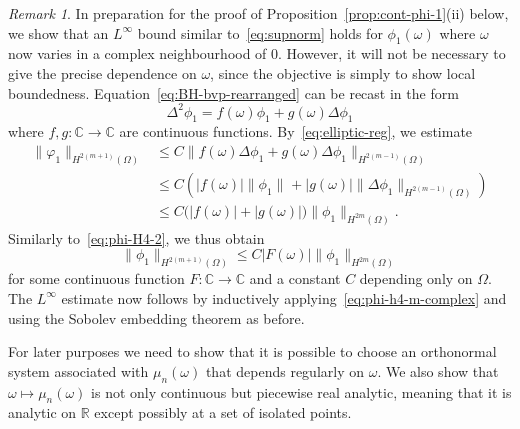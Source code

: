 \documentclass[a4paper, reqno]{amsart}
\numberwithin{equation}{section}
\theoremstyle{plain}
\theoremstyle{definition}
\theoremstyle{remark}
\newtheorem{remark}[theorem]{Remark}
\newcommand{\RR}{\mathbb{R}}
\newcommand{\CC}{\mathbb{C}}
\begin{document}
\begin{remark}
  \label{rmk:complex-omega}
  In preparation for the proof of Proposition~\ref{prop:cont-phi-1}(ii) below, we show that an $L^\infty$ bound similar to~\eqref{eq:supnorm} holds for $\phi_1(\omega)$ where $\omega$ now varies in a complex neighbourhood of 0. However, it will not be necessary to give the precise dependence on $\omega$, since the objective is simply to show local boundedness. Equation~\eqref{eq:BH-bvp-rearranged} can be recast in the form
  \begin{displaymath}
    \Delta^2 \phi_1 = f(\omega)\phi_1 + g(\omega) \Delta\phi_1
  \end{displaymath}
  where $f, g\colon \CC \to \CC$ are continuous functions. By~\eqref{eq:elliptic-reg}, we estimate
  \begin{displaymath}
    \begin{aligned}
      \| \varphi_1 \|_{H^{2(m+1)}(\Omega)} & \leq C \|f(\omega) \Delta \phi_1+g(\omega)\Delta\phi_1\|_{H^{2(m-1)}(\Omega)}                         \\
                                           & \leq C \left( |f(\omega)| \|\phi_1\|_{} + |g(\omega)| \| \Delta\phi_1 \|_{H^{2(m-1)}(\Omega)} \right) \\
                                           & \leq C\bigl(|f(\omega)| + |g(\omega)|\bigr) \|\phi_1\|_{H^{2m}(\Omega)}.
    \end{aligned}
  \end{displaymath}
  Similarly to~\eqref{eq:phi-H4-2}, we thus obtain
  \begin{equation}
    \label{eq:phi-h4-m-complex}
    \| \phi_1 \|_{H^{2(m+1)}(\Omega)} \leq C |F(\omega)| \| \phi_1 \|_{H^{2m}(\Omega)}
  \end{equation}
  for some continuous function $F\colon \CC \to \CC$ and a constant $C$ depending only on $\Omega$. The $L^\infty$ estimate now follows by inductively applying~\eqref{eq:phi-h4-m-complex} and using the Sobolev embedding theorem as before.
\end{remark}

For later purposes we need to show that it is possible to choose an orthonormal system associated with $\mu_n(\omega)$ that depends regularly on $\omega$. We also show that $\omega\mapsto\mu_n(\omega)$ is not only continuous but piecewise real analytic, meaning that it is analytic on $\RR$ except possibly at a set of isolated points.
\end{document}
